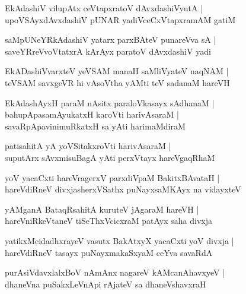 \begin{shloka}
EkAdashiV vilupAtx ceVtapxratoV dAvxdashiVyutA |\\
upoVSAyxdAvxdashiV pUNAR yadiVceCxVtapxramAM gatiM
\end{shloka}

\begin{shloka}
saMpUNeYRkAdashiV yatarx parxBAteV punareVva sA |\\
saveYRreVvoVtatxrA kArAyx paratoV dAvxdashiV yadi
\end{shloka}

\begin{shloka}
EkADashiVvarxteV yeVSAM manaH saMliVyateV naqNAM |\\
teVSAM savxgeVR hi vAsoVtha yAMti teV sadanaM hareVH
\end{shloka}

\begin{shloka}
EkAdashAyxH paraM nAsitx paraloVkasayx sAdhanaM |\\
bahupApasamAyukatxH karoVti harivAsaraM |\\
savaRpApavinimuRkatxH sa yAti harimaMdiraM 
\end{shloka}

\begin{shloka}
patisahitA yA yoVSitakxroVti harivAsaraM |\\
suputArx sAvxmisuBagA yAti perxVtayx hareVgaqRhaM
\end{shloka}

\begin{shloka}
yoV yacaCxti hareVragerxV parxdiVpaM BakitxBAvataH |\\
hareVdiRneV divxjasherxVSathx puNayxsaMKAyx na vidayxteV 
\end{shloka}

\begin{shloka}
yAMganA BataqRsahitA kuruteV jAgaraM hareVH |\\
hareVniRkeVtaneV tiSeThxVcicxraM patAyx saha divxja
\end{shloka}

\begin{shloka}
yatikxMcidadhxrayeV vasutx BakAtxyX yacaCxti yoV divxja |\\
hareVdiRneV tasayx puNayxmakaSxyaM ceYva savaRdA
\end{shloka}

\begin{shloka}
purAsiVdavxlalxBoV nAmAnx nagareV kAMcanAhavxyeV |\\
dhaneVna puSakxLeVnApi rAjateV sa dhaneVshavxraH 
\end{shloka}

